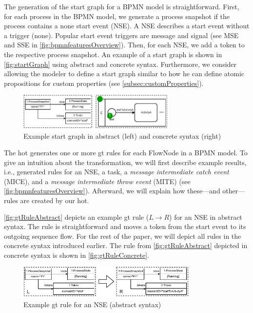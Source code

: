 \documentclass[runningheads]{llncs}
\begin{document}
The generation of the start graph for a BPMN model is straightforward.
First, for each process in the BPMN model, we generate a process snapshot if the process contains a none start event (NSE).
A NSE describes a start event without a trigger (none).
Popular start event triggers are message and signal (see MSE and SSE in \autoref{fig:bpmnfeaturesOverview}).
Then, for each NSE, we add a token to the respective process snapshot.
An example of a start graph is shown in \autoref{fig:startGraph} using abstract and concrete syntax.
Furthermore, we consider allowing the modeler to define a start graph similar to how he can define atomic propositions for custom properties (see \autoref{subsec:customProperties}).

\begin{figure}[ht]
    \centering
    \includegraphics[width=0.7\textwidth]{images/startGraph.pdf}
    \caption{Example start graph in abstract (left) and concrete syntax (right)}
    \label{fig:startGraph}
\end{figure}

The \gls*{hot} generates one or more \gls*{gt} rules for each \textsf{FlowNode} in a BPMN model.
To give an intuition about the transformation, we will first describe example results, i.e., generated rules for an NSE, a task, a \textit{message intermediate catch event} (MICE), and a \textit{message intermediate throw event} (MITE) (see \autoref{fig:bpmnfeaturesOverview}).
Afterward, we will explain how these---and other---rules are created by our \gls*{hot}.

\autoref{fig:gtRuleAbstract} depicts an example \gls*{gt} rule ($L \to R$) for an NSE in abstract syntax.
The rule is straightforward and moves a token from the start event to its outgoing sequence flow.
For the rest of the paper, we will depict all rules in the concrete syntax introduced earlier.
The rule from \autoref{fig:gtRuleAbstract} depicted in concrete syntax is shown in \autoref{fig:gtRuleConcrete}.

\begin{figure}[ht]
    \centering
  \includegraphics[width=0.8\textwidth]{images/rule_abstract.pdf}
  \caption{Example \gls*{gt} rule for an NSE (abstract syntax)}  \label{fig:gtRuleAbstract}
\end{figure}
\end{document}
